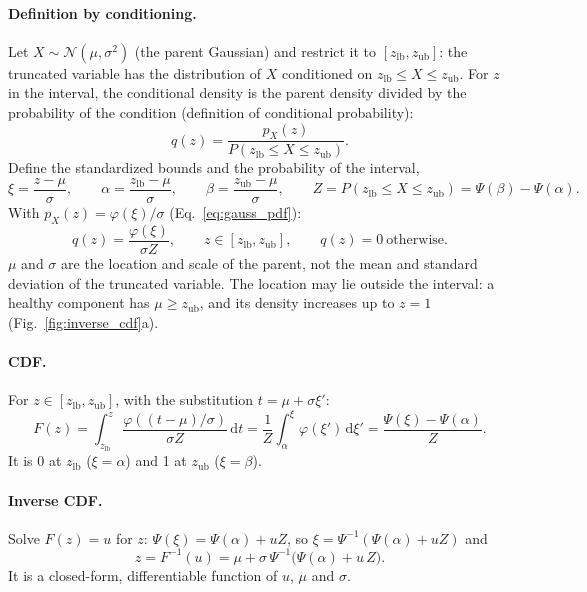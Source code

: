 \documentclass[11pt,a4paper]{article}
\numberwithin{equation}{section}
\theoremstyle{plain}
\theoremstyle{definition}
\theoremstyle{remark}
\newcommand{\N}{\mathcal{N}}
\newcommand{\dd}{\,\mathrm{d}}
\newcommand{\zlb}{z_{\text{lb}}}
\newcommand{\zub}{z_{\text{ub}}}
\begin{document}
\paragraph{Definition by conditioning.} Let $X\sim\N(\mu,\sigma^2)$ (the parent Gaussian) and restrict it to $[\zlb,\zub]$: the truncated variable has the distribution of $X$ conditioned on $\zlb\le X\le\zub$. For $z$ in the interval, the conditional density is the parent density divided by the probability of the condition (definition of conditional probability):
\begin{equation*}
q(z)=\frac{p_X(z)}{P(\zlb\le X\le\zub)}.
\end{equation*}
Define the standardized bounds and the probability of the interval,
\begin{equation}
\xi=\frac{z-\mu}{\sigma},\qquad\alpha=\frac{\zlb-\mu}{\sigma},\qquad\beta=\frac{\zub-\mu}{\sigma},\qquad Z=P(\zlb\le X\le\zub)=\Psi(\beta)-\Psi(\alpha).
\end{equation}
With $p_X(z)=\varphi(\xi)/\sigma$ (Eq.~\eqref{eq:gauss_pdf}):
\begin{equation}
q(z)=\frac{\varphi(\xi)}{\sigma Z},\qquad z\in[\zlb,\zub],\qquad q(z)=0\ \text{otherwise}.
\end{equation}
$\mu$ and $\sigma$ are the location and scale of the parent, not the mean and standard deviation of the truncated variable. The location may lie outside the interval: a healthy component has $\mu\ge\zub$, and its density increases up to $z=1$ (Fig.~\ref{fig:inverse_cdf}a).

\paragraph{CDF.} For $z\in[\zlb,\zub]$, with the substitution $t=\mu+\sigma\xi'$:
\begin{equation}
F(z)=\int_{\zlb}^z\frac{\varphi((t-\mu)/\sigma)}{\sigma Z}\dd t=\frac1Z\int_\alpha^\xi\varphi(\xi')\dd\xi'=\frac{\Psi(\xi)-\Psi(\alpha)}{Z}.
\end{equation}
It is 0 at $\zlb$ ($\xi=\alpha$) and 1 at $\zub$ ($\xi=\beta$).

\paragraph{Inverse CDF.} Solve $F(z)=u$ for $z$: $\Psi(\xi)=\Psi(\alpha)+uZ$, so $\xi=\Psi^{-1}(\Psi(\alpha)+uZ)$ and
\begin{equation}
z=F^{-1}(u)=\mu+\sigma\,\Psi^{-1}\big(\Psi(\alpha)+u\,Z\big).
\label{eq:tn_quantile}
\end{equation}
It is a closed-form, differentiable function of $u$, $\mu$ and $\sigma$.
\end{document}
